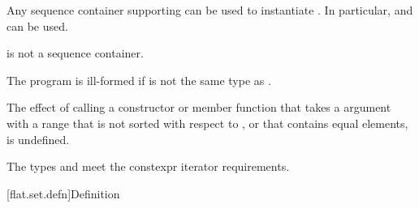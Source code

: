 \pnum
Any sequence container
supporting 
can be used to instantiate .
In particular,  and 
can be used.
\begin{note}
 is not a sequence container.
\end{note}

\pnum
The program is ill-formed if  is not the same type
as .

\pnum
The effect of calling a constructor or member function
that takes a  argument
with a range that is not sorted with respect to , or
that contains equal elements, is undefined.

\pnum
The types  and  meet
the constexpr iterator requirements.

[flat.set.defn]{Definition}

